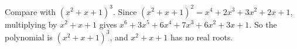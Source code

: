 Compare with $(x^2+x+1)^3$. Since $(x^2+x+1)^2=x^4+2x^3+3x^2+2x+1$, multiplying by $x^2+x+1$ gives $x^6+3x^5+6x^4+7x^3+6x^2+3x+1$. So the polynomial is $\boxed{(x^2+x+1)^3}$, and $x^2+x+1$ has no real roots.
